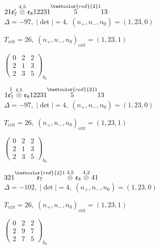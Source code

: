 \documentclass[10pt]{article}
\begin{document}
\smallskip

$21\mathfrak{e}_7'\overset{4,5}{\otimes}\mathfrak{e}_812231\overset{\textcolor{red}{2}1}{5}13$ \quad $\Delta=-97,\; |\det|=4,\; (n_+,n_-,n_0)=(1,23,0)$

\hspace{1em}$T_{\text{crit}}=26,\; (n_+,n_-,n_0)_{\text{crit}}=(1,23,1)$

\hspace{2em}$\left(\begin{smallmatrix}0 & 2 & 2 \\ 2 & 1 & 3 \\ 2 & 3 & 5\end{smallmatrix}\right)_{\!b_0}$

\smallskip

$1\overset{1}{\mathfrak{e}_7'}\overset{4,5}{\otimes}\mathfrak{e}_812231\overset{\textcolor{red}{2}1}{5}13$ \quad $\Delta=-97,\; |\det|=4,\; (n_+,n_-,n_0)=(1,23,0)$

\hspace{1em}$T_{\text{crit}}=26,\; (n_+,n_-,n_0)_{\text{crit}}=(1,23,1)$

\hspace{2em}$\left(\begin{smallmatrix}0 & 2 & 2 \\ 2 & 1 & 3 \\ 2 & 3 & 5\end{smallmatrix}\right)_{\!b_0}$

\smallskip

$321\overset{\textcolor{red}{2}1}{\mathfrak{e}_7}\overset{4,5}{\otimes}\mathfrak{e}_8\overset{4,2}{\otimes}41$ \quad $\Delta=-102,\; |\det|=4,\; (n_+,n_-,n_0)=(1,23,0)$

\hspace{1em}$T_{\text{crit}}=26,\; (n_+,n_-,n_0)_{\text{crit}}=(1,23,1)$

\hspace{2em}$\left(\begin{smallmatrix}0 & 2 & 2 \\ 2 & 9 & 7 \\ 2 & 7 & 5\end{smallmatrix}\right)_{\!b_0}$
\end{document}
